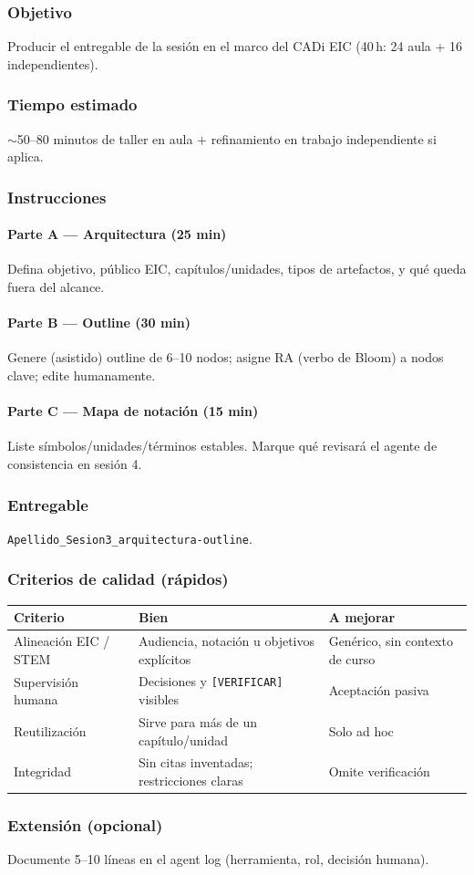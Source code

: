 \subsubsection*{Objetivo}
Producir el entregable de la sesión en el marco del CADi EIC (40\,h: 24 aula + 16 independientes).

\subsubsection*{Tiempo estimado}
$\sim$50--80 minutos de taller en aula + refinamiento en trabajo independiente si aplica.

\subsubsection*{Instrucciones}
\paragraph{Parte A --- Arquitectura (25 min)} Defina objetivo, público EIC, capítulos/unidades, tipos de artefactos, y qué queda fuera del alcance.
\paragraph{Parte B --- Outline (30 min)} Genere (asistido) outline de 6--10 nodos; asigne RA (verbo de Bloom) a nodos clave; edite humanamente.
\paragraph{Parte C --- Mapa de notación (15 min)} Liste símbolos/unidades/términos estables. Marque qué revisará el agente de consistencia en sesión 4.

\subsubsection*{Entregable}
\texttt{Apellido\_Sesion3\_arquitectura-outline}.

\subsubsection*{Criterios de calidad (rápidos)}
\begin{tabularx}{\textwidth}{@{}lXX@{}}
\toprule
Criterio & Bien & A mejorar \\
\midrule
Alineación EIC / STEM & Audiencia, notación u objetivos explícitos & Genérico, sin contexto de curso \\
Supervisión humana & Decisiones y \texttt{[VERIFICAR]} visibles & Aceptación pasiva \\
Reutilización & Sirve para más de un capítulo/unidad & Solo ad hoc \\
Integridad & Sin citas inventadas; restricciones claras & Omite verificación \\
\bottomrule
\end{tabularx}

\subsubsection*{Extensión (opcional)}
Documente 5--10 líneas en el agent log (herramienta, rol, decisión humana).
